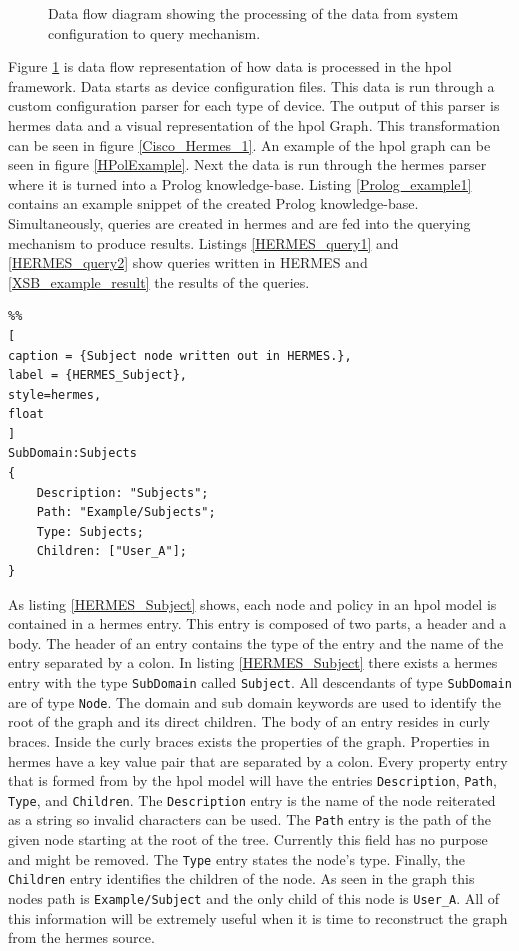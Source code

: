 \documentclass[12pt,letterpaper]{report}
\begin{document}
\begin{figure}
	\caption[HPol Framework Data Processing Flowchart]{Data flow diagram showing the processing of the data from system configuration to query mechanism.}
	\label{BigPicture}		
\end{figure}	

Figure \ref{BigPicture} is data flow representation of how data is processed in the \ac{hpol} framework. Data starts as device configuration files. This data is run through a custom configuration parser for each type of device. The output of this parser is \ac{hermes} data and a visual representation of the \ac{hpol} Graph. This transformation can be seen in figure \ref{Cisco_Hermes_1}. An example of the \ac{hpol} graph can be seen in figure \ref{HPolExample}. Next the data is run through the \ac{hermes} parser where it is turned into a Prolog knowledge-base. Listing \ref{Prolog_example1} contains an example snippet of the created Prolog knowledge-base. Simultaneously, queries are created in \ac{hermes} and are fed into the querying mechanism to produce results. Listings \ref{HERMES_query1} and \ref{HERMES_query2} show queries written in HERMES and \ref{XSB_example_result} the results of the queries.


\begin{lstlisting}%%
[
caption = {Subject node written out in HERMES.},
label = {HERMES_Subject},
style=hermes,
float
]
SubDomain:Subjects
{
	Description: "Subjects";
	Path: "Example/Subjects";
	Type: Subjects;
	Children: ["User_A"];
}
\end{lstlisting}

As listing \ref{HERMES_Subject} shows, each node and policy in an \ac{hpol} model is contained in a \ac{hermes} entry. This entry is composed of two parts, a header and a body. The header of an entry contains the type of the entry and the name of the entry separated by a colon. In listing \ref{HERMES_Subject} there exists a \ac{hermes} entry with the type \texttt{SubDomain} called \texttt{Subject}. All descendants of type \texttt{SubDomain} are of type \texttt{Node}. The domain and sub domain keywords are used to identify the root of the graph and its direct children.  The body of an entry resides in curly braces. Inside the curly braces exists the properties of the graph. Properties in \ac{hermes} have a key value pair that are separated by a colon. Every property entry that is formed from by the \ac{hpol} model will have the entries \texttt{Description}, \texttt{Path}, \texttt{Type}, and \texttt{Children}. The \texttt{Description} entry is the name of the node reiterated as a string so invalid characters can be used. The \texttt{Path} entry is the path of the given node starting at the root of the tree. Currently this field has no purpose and might be removed. The \texttt{Type} entry states the node's type. Finally, the \texttt{Children} entry identifies the children of the node. As seen in the graph this nodes path is \texttt{Example/Subject} and the only child of this node is \texttt{User\_A}. All of this information will be extremely useful when it is time to reconstruct the graph from the \ac{hermes} source.
\end{document}
